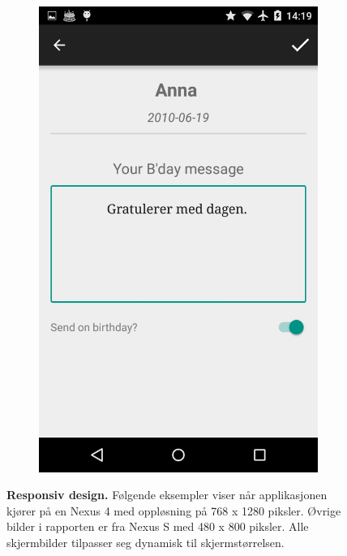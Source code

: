 \begin{figure}[ht]
\begin{subfigure}[b]{0.35\textwidth}
        \includegraphics[width=\textwidth]{./img/nexus4/3.png}
        \label{fig:res_meld}
    \end{subfigure}
    \caption[Responsiv design]{\textbf{Responsiv design.} Følgende eksempler viser når applikasjonen kjører på en Nexus 4 med oppløsning på 768 x 1280 piksler. Øvrige bilder i rapporten er fra Nexus S med 480 x 800 piksler. Alle skjermbilder tilpasser seg dynamisk til skjermstørrelsen.}
    \label{fig:responsiv_design}
\end{figure}


